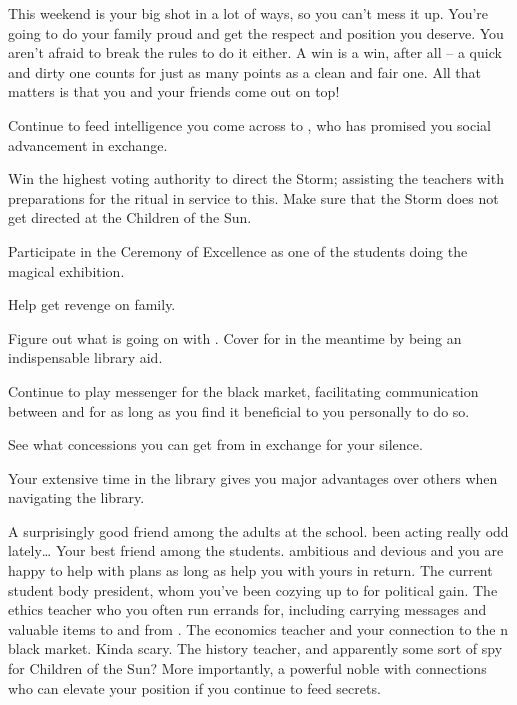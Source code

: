 \documentclass[char]{GL2020}
\begin{document}
This weekend is your big shot in a lot of ways, so you can't mess it up. You're going to do your family proud and get the respect and position you deserve. You aren't afraid to break the rules to do it either. A win is a win, after all -- a quick and dirty one counts for just as many points as a clean and fair one. All that matters is that you and your friends come out on top!

\begin{itemz}
	\item Continue to feed intelligence you come across to \cHistory{}, who has promised you social advancement in exchange. 
	\item Win the highest voting authority to direct the Storm; assisting the teachers with preparations for the ritual in service to this. Make sure that the Storm does not get directed at the Children of the Sun.
	\item Participate in the Ceremony of Excellence as one of the students doing the magical exhibition.
	\item Help \cAdopted{} get revenge on \cAdopted{\their} family.
	\item Figure out what is going on with \cLibrarian{}. Cover for \cLibrarian{} in the meantime by being an indispensable library aid.
\item Continue to play messenger for the black market, facilitating communication between \cEthics{} and \cChupSecond{} for as long as you find it beneficial to you personally to do so.
	\item See what concessions you can get from \cInterpol{} in exchange for your silence.
\end{itemz}

\begin{itemz}[Notes]
	\item Your extensive time in the library gives you major advantages over others when navigating the library.
\end{itemz}

\begin{contacts}
	\contact{\cLibrarian{}} A surprisingly good friend among the adults at the school. \cLibrarian{\They} \cLibrarian{\have} been acting really odd lately\ldots{}
	\contact{\cAdopted{}} Your best friend among the students. \cAdopted{\Theyare} ambitious and devious and you are happy to help \cAdopted{\them} with \cAdopted{\their} plans as long as \cAdopted{\they} help\cAdopted{\plural} you with yours in return.
	\contact{\cPresident{}} The current student body president, whom you've been cozying up to for political gain.
	\contact{\cEthics{}} The ethics teacher who you often run errands for, including carrying messages and valuable items to and from \cChupSecond{}.
	\contact{\cChupSecond{}} The economics teacher and your connection to the \pEarth{}n black market. Kinda scary.
	\contact{\cHistory{}} The history teacher, and apparently some sort of spy for Children of the Sun? More importantly, a powerful noble with connections who can elevate your position if you continue to feed \cHistory{\them} secrets.
\end{contacts}
\end{document}

